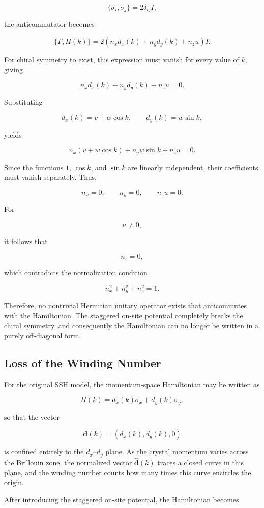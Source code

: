 \documentclass[11pt, a4paper]{article}
\begin{document}
\[
\{\sigma_i,\sigma_j\}=2\delta_{ij}I,
\]

the anticommutator becomes

\[
\{\Gamma,H(k)\}
=
2\left(
n_xd_x(k)+n_yd_y(k)+n_zu
\right)I.
\]

For chiral symmetry to exist, this expression must vanish for every value of
$k$, giving

\[
n_xd_x(k)+n_yd_y(k)+n_zu=0.
\]

Substituting

\[
d_x(k)=v+w\cos k,
\qquad
d_y(k)=w\sin k,
\]

yields

\[
n_x(v+w\cos k)
+
n_yw\sin k
+
n_zu
=0.
\]

Since the functions \(1\), \(\cos k\), and \(\sin k\) are linearly
independent, their coefficients must vanish separately. Thus,

\[
n_x=0,\qquad
n_y=0,\qquad
n_zu=0.
\]

For

\[
u\neq0,
\]

it follows that

\[
n_z=0,
\]

which contradicts the normalization condition

\[
n_x^2+n_y^2+n_z^2=1.
\]

Therefore, no nontrivial Hermitian unitary operator exists that anticommutes
with the Hamiltonian. The staggered on-site potential completely breaks the
chiral symmetry, and consequently the Hamiltonian can no longer be written in
a purely off-diagonal form.


\subsection{Loss of the Winding Number}

For the original SSH model, the momentum-space Hamiltonian may be written as

\[
H(k)=d_x(k)\sigma_x+d_y(k)\sigma_y,
\]

so that the vector

\[
\mathbf d(k)=\left(d_x(k),d_y(k),0\right)
\]

is confined entirely to the $d_x$--$d_y$ plane. As the crystal momentum
varies across the Brillouin zone, the normalized vector
$\hat{\mathbf d}(k)$ traces a closed curve in this plane, and the
winding number counts how many times this curve encircles the origin.

After introducing the staggered on-site potential, the Hamiltonian
becomes
\end{document}
